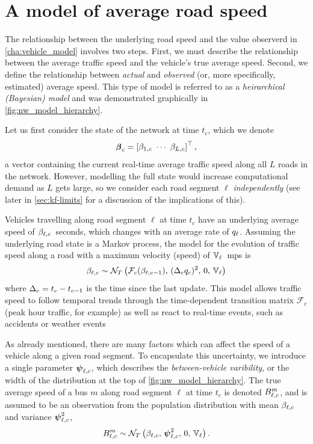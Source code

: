 \section{A model of average road speed}
\label{sec:nw_model}


The relationship between the underlying road speed and the value observerd in \cref{cha:vehicle_model} involves two steps. First, we must describe the relationship between the average traffic speed and the vehicle's true average speed. Second, we define the relationship between \emph{actual} and \emph{observed} (or, more specifically, estimated) average speed. This type of model is referred to as a \emph{heirarchical (Bayesian) model} and was demonstrated graphically in \cref{fig:nw_model_hierarchy}.


Let us first consider the state of the network at time $t_c$, which we denote
\begin{equation}\label{eq:nw_state}
\boldsymbol{\beta}_c =
\left[\beta_{1,c}\ \cdots\ \beta_{L,c}\right]^\top,
\end{equation}
a vector containing the current real-time average traffic speed along all $L$ roads in the network. However, modelling the full state would increase computational demand as $L$ gets large, so we consider each road segment $\ell$ \emph{independently} (see later in \cref{sec:kf-limits} for a discussion of the implications of this).


Vehicles travelling along road segment $\ell$ at time $t_c$ have an underlying average speed of $\beta_{\ell,c}$~seconds, which changes with an average rate of $q_\ell$. Assuming the underlying road state is a Markov process, the model for the evolution of traffic speed along a road with a maximum velocity (speed) of $\mathbb{V}_\ell$~\gls{mps} is
\begin{equation}\label{eq:nw_state_markov}
\beta_{\ell,c} \sim
\mathcal{N}_T\left(\mathcal{F}_c(\beta_{\ell,c-1}),\, (\Delta_c q_c)^2,\, 0,\, \mathbb{V}_\ell\right)
\end{equation}
where $\Delta_c = t_c - t_{c-1}$ is the time since the last update. This model allows traffic speed to follow temporal trends through the time-dependent transition matrix $\mathcal{F}_c$ (peak hour traffic, for example) as well as react to real-time events, such as accidents or weather events


As already mentioned, there are many factors which can affect the speed of a vehicle along a given road segment. To encapsulate this uncertainty, we introduce a single parameter $\mathbf{\boldsymbol{\psi}}_{\ell,c}$, which describes the \emph{between-vehicle varibility}, or the width of the distribution at the top of \cref{fig:nw_model_hierarchy}. The true average speed of a bus $m$ along road segment $\ell$ at time $t_c$ is denoted $B_{\ell,c}^m$, and is assumed to be an observation from the population distribution with mean $\beta_{\ell,c}$ and variance $\mathbf{\boldsymbol{\psi}}_{\ell,c}^2$,
\begin{equation}\label{eq:nw_vehicle_tt}
B_{\ell,c}^m \sim
\mathcal{N}_T\left(\beta_{\ell,c},\, \mathbf{\boldsymbol{\psi}}_{\ell,c}^2,\, 0,\, \mathbb{V}_\ell\right).
\end{equation}


